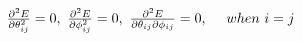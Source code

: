 \documentclass[9pt]{report}
\begin{document}

$\pdv[2]{E}{\theta_{ij}} = 0,\ \pdv[2]{E}{\phi_{ij}} = 0,\ \pdv[2]{E}{\theta_{ij}}{\phi_{ij}} = 0,\ \ \ \ when \ i = j$
\newline
\end{document}
